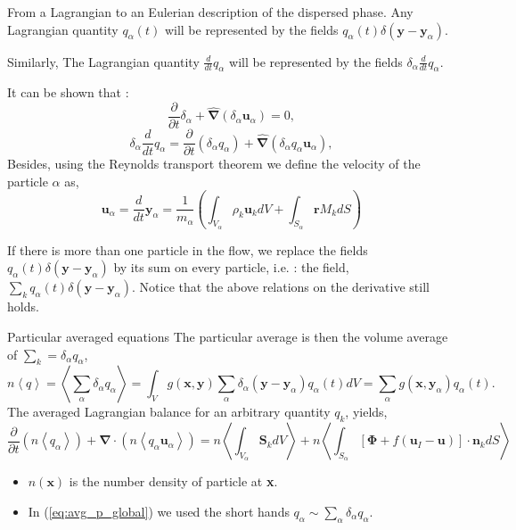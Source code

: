 \documentclass{sintefbeamer}
\newcommand{\avg}[1]{\left<#1\right>}
\newcommand{\pavg}[1]{n \left<#1\right>}
\newcommand{\nablab}{\bm{\nabla}}
\newcommand{\nablabh}{\hat{\bm{\nabla}}}
\newcommand{\ddt}{\frac{d}{d t}}
\newcommand{\pddt}{\frac{\partial}{\partial t}}
\begin{document}
\begin{frame}{From a Lagrangian to an Eulerian description of the dispersed phase.}
  Any Lagrangian quantity $q_\alpha(t)$ will be represented by the fields $q_\alpha(t)\delta(\textbf{y}-\textbf{y}_\alpha)$.

  Similarly, The Lagrangian quantity $\ddt q_\alpha$ will be represented by the fields $\delta_\alpha \ddt q_\alpha$.

  It can be shown that : 
  \begin{equation*}
    \pddt \delta_\alpha
    + \nablabh (\delta_\alpha \textbf{u}_\alpha)
    = 0,
    \label{eq:delta_q_alpha_dt}
\end{equation*}
\begin{equation*}
    \delta_\alpha \ddt q_\alpha
    = \pddt (\delta_\alpha q_\alpha)
    + \nablabh (\delta_\alpha q_\alpha \textbf{u}_\alpha),
    \label{eq:delta_q_alpha_dt}
\end{equation*}
Besides, using the Reynolds transport theorem we define the velocity of the particle $\alpha$ as,  
\begin{equation*}
  \textbf{u}_\alpha
  = \ddt \textbf{y}_\alpha
  = \frac{1}{m_\alpha} \left(
      \int_{V_\alpha} \rho_k \textbf{u}_k dV
      +  \int_{S_\alpha} \textbf{r} M_k dS
  \right)
\end{equation*}

If there is more than one particle in the flow, we replace the fields $q_\alpha(t)\delta(\textbf{y}-\textbf{y}_\alpha)$ by its sum on every particle, i.e. : the field, $\sum_k q_\alpha(t)\delta(\textbf{y}-\textbf{y}_\alpha)$.
Notice that the above relations on the derivative still holds.
\end{frame}


\begin{frame}{Particular averaged equations}  
  The particular average is then the volume average of $\sum_k = \delta_\alpha q_\alpha$,
  \begin{equation*}
    \pavg{q}
    = \avg{\sum_\alpha \delta_\alpha q_\alpha} 
    = \int_V g(\textbf{x},\textbf{y}) \sum_\alpha \delta_\alpha(\textbf{y}- \textbf{y}_\alpha) q_\alpha(t) dV 
    =  \sum_\alpha g(\textbf{x},\textbf{y}_\alpha) q_\alpha(t).
\end{equation*}
The averaged Lagrangian balance for an arbitrary quantity $q_k$, yields, 
\begin{equation}
  \pddt   \left(\pavg{q_\alpha}\right)
  + \nablab \cdot \left(\pavg{q_\alpha \textbf{u}_\alpha}\right) 
  = \pavg{\int_{V_\alpha} \textbf{S}_k dV}
  + \pavg{\int_{S_\alpha} \left[\bm{\Phi} + f (\textbf{u}_I-\textbf{u}) \right] \cdot \textbf{n}_k d S}
  \label{eq:avg_p_global}
\end{equation}
\begin{itemize}
  \item $n(\textbf{x})$ is the number density of particle at \textbf{x}.  
  \item In (\ref{eq:avg_p_global}) we used the short hands $q_\alpha \sim \sum_\alpha \delta_\alpha q_\alpha$.
\end{itemize}
\end{frame}
\end{document}
